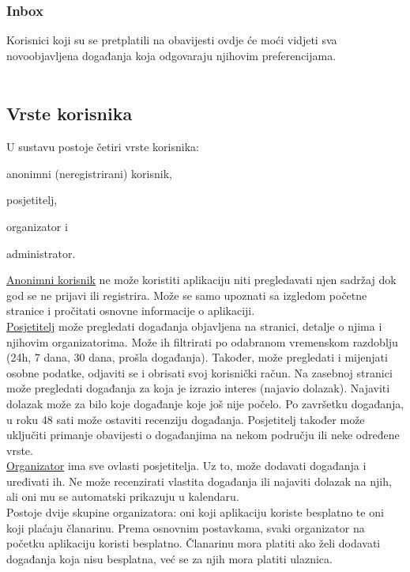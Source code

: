 				\subsubsection{Inbox}
				Korisnici koji su se pretplatili na obavijesti ovdje će moći vidjeti sva novoobjavljena događanja koja odgovaraju njihovim preferencijama. \\ \\
				
			
			\subsection{Vrste korisnika}
			U sustavu postoje četiri vrste korisnika:
			\begin{packed_enum}
				\item anonimni (neregistrirani) korisnik,
				\item posjetitelj,
				\item organizator i 
				\item administrator.
			\end{packed_enum}
			
			\underline{Anonimni korisnik} ne može koristiti aplikaciju niti pregledavati njen sadržaj dok god se ne prijavi ili registrira. Može se samo upoznati sa izgledom početne stranice i pročitati osnovne informacije o aplikaciji. \\
			
			\underline{Posjetitelj} može pregledati događanja objavljena na stranici, detalje o njima i njihovim organizatorima. Može ih filtrirati po odabranom vremenskom razdoblju (24h, 7 dana, 30 dana, prošla događanja). Također, može pregledati i mijenjati osobne podatke, odjaviti se i obrisati svoj korisnički račun. Na zasebnoj stranici može pregledati događanja za koja je izrazio interes (najavio dolazak). Najaviti dolazak može za bilo koje događanje koje još nije počelo. Po završetku događanja, u roku 48 sati može ostaviti recenziju događanja. Posjetitelj također može uključiti primanje obavijesti o događanjima na nekom području ili neke određene vrste. \\
			
			\underline{Organizator} ima sve ovlasti posjetitelja. Uz to, može dodavati događanja i uređivati ih. Ne može recenzirati vlastita događanja ili najaviti dolazak na njih, ali oni mu se automatski prikazuju u kalendaru.\\
			Postoje dvije skupine organizatora: oni koji aplikaciju koriste besplatno te oni koji plaćaju članarinu. Prema osnovnim postavkama, svaki organizator na početku aplikaciju koristi besplatno. Članarinu mora platiti ako želi dodavati događanja koja nisu besplatna, već se za njih mora platiti ulaznica. \\
			
